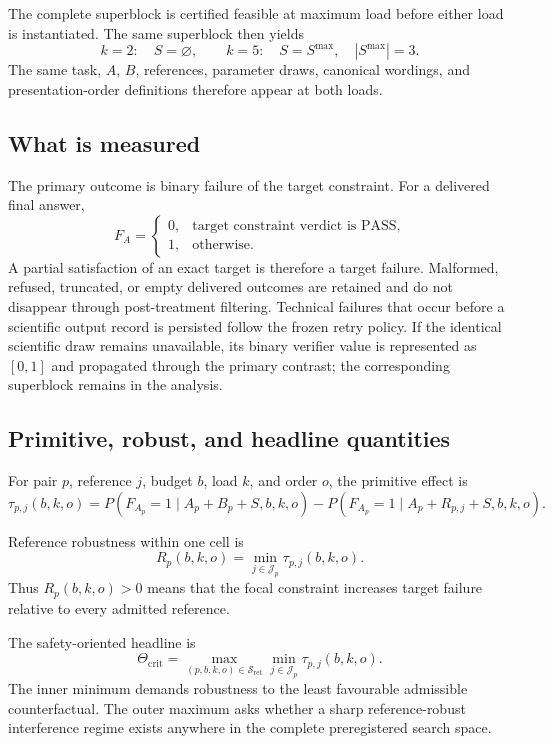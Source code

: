 \documentclass[11pt,a4paper]{article}
\newcommand{\Tcrit}{\Theta_{\mathrm{crit}}}
\newcommand{\Sc}{\mathcal S_{\mathrm{ret}}}
\begin{document}
The complete superblock is certified feasible at maximum load before either load is instantiated. The same superblock then yields
\[
k=2:\quad S=\varnothing,
\qquad
k=5:\quad S=S^{\max},\quad |S^{\max}|=3.
\]
The same task, $A$, $B$, references, parameter draws, canonical wordings, and presentation-order definitions therefore appear at both loads.

\subsection{What is measured}

The primary outcome is binary failure of the target constraint. For a delivered final answer,
\[
F_A=
\begin{cases}
0,&\text{target constraint verdict is PASS},\\
1,&\text{otherwise}.
\end{cases}
\]
A partial satisfaction of an exact target is therefore a target failure. Malformed, refused, truncated, or empty delivered outcomes are retained and do not disappear through post-treatment filtering. Technical failures that occur before a scientific output record is persisted follow the frozen retry policy. If the identical scientific draw remains unavailable, its binary verifier value is represented as $[0,1]$ and propagated through the primary contrast; the corresponding superblock remains in the analysis.

\subsection{Primitive, robust, and headline quantities}

For pair $p$, reference $j$, budget $b$, load $k$, and order $o$, the primitive effect is
\[
\tau_{p,j}(b,k,o)
=
P(F_{A_p}=1\mid A_p+B_p+S,b,k,o)
-
P(F_{A_p}=1\mid A_p+R_{p,j}+S,b,k,o).
\]

Reference robustness within one cell is
\[
R_p(b,k,o)=\min_{j\in\mathcal J_p}\tau_{p,j}(b,k,o).
\]
Thus $R_p(b,k,o)>0$ means that the focal constraint increases target failure relative to every admitted reference.

The safety-oriented headline is
\[
\Tcrit
=
\max_{(p,b,k,o)\in\Sc}
\min_{j\in\mathcal J_p}\tau_{p,j}(b,k,o).
\]
The inner minimum demands robustness to the least favourable admissible counterfactual. The outer maximum asks whether a sharp reference-robust interference regime exists anywhere in the complete preregistered search space.
\end{document}
